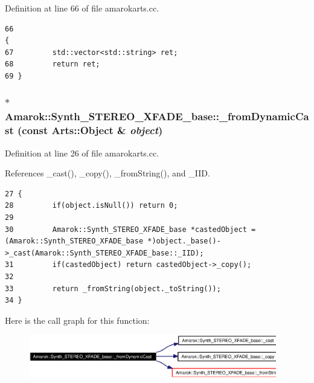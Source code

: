 Definition at line 66 of file amarokarts.cc.



\footnotesize\begin{verbatim}66                                                                            {
67         std::vector<std::string> ret;
68         return ret;
69 }
\end{verbatim}\normalsize 
{}
\subsubsection{ $\ast$ Amarok::Synth\_\-STEREO\_\-XFADE\_\-base::\_\-from\-Dynamic\-Cast (const Arts::Object \& {\em object})\hspace{0.3cm}{\tt  [static]}}\label{classAmarok_1_1Synth__STEREO__XFADE__base_Amarok_1_1Synth__STEREO__XFADE__stube3}




Definition at line 26 of file amarokarts.cc.

References \_\-cast(), \_\-copy(), \_\-from\-String(), and \_\-IID.



\footnotesize\begin{verbatim}27 {
28         if(object.isNull()) return 0;
29 
30         Amarok::Synth_STEREO_XFADE_base *castedObject = (Amarok::Synth_STEREO_XFADE_base *)object._base()->_cast(Amarok::Synth_STEREO_XFADE_base::_IID);
31         if(castedObject) return castedObject->_copy();
32 
33         return _fromString(object._toString());
34 }
\end{verbatim}\normalsize 


Here is the call graph for this function:\begin{figure}[H]
\begin{center}
\leavevmode
\includegraphics[width=307pt]{classAmarok_1_1Synth__STEREO__XFADE__base_Amarok_1_1Synth__STEREO__XFADE__stube3_cgraph}
\end{center}
\end{figure}
